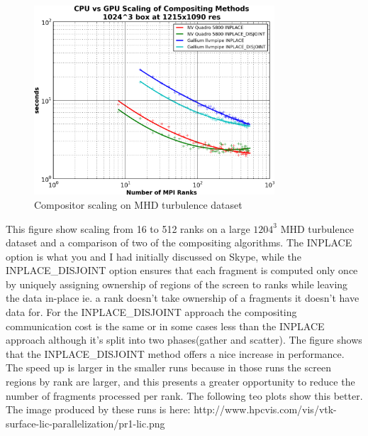 \documentclass[a4paper,10pt]{article}
\begin{document}
\begin{figure}[h]
 \centering
 \includegraphics[width=0.8\textwidth]{./scaling-composite-cube-gpu.png}
 \caption{Compositor scaling on MHD turbulence dataset}
 \label{fig:comp-scaling}
\end{figure}
This figure show scaling from 16 to 512 ranks on a large $1204^3$ MHD turbulence dataset and a comparison of two of the compositing algorithms. The INPLACE option is what you and I had initially discussed on Skype, while the INPLACE\_DISJOINT option ensures that each fragment is computed only once by uniquely assigning ownership of regions of the screen to ranks while leaving the data in-place ie. a rank doesn't take ownership of a fragments it doesn't have data for. For the INPLACE\_DISJOINT approach the compositing communication cost is the same or in some cases less than the INPLACE approach although it's split into two phases(gather and scatter). The figure shows that the INPLACE\_DISJOINT method offers a nice increase in performance. The speed up is larger in the smaller runs because in those runs the screen regions by rank are larger, and this presents a greater opportunity to reduce the number of fragments processed per rank. The following teo plots show this better. The image produced by these runs is here: http://www.hpcvis.com/vis/vtk-surface-lic-parallelization/pr1-lic.png
\end{document}
